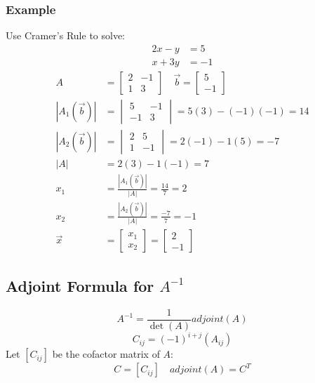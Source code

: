 \documentclass[letterpaper, 12pt]{math}
\begin{document}
\subsubsection*{Example}
Use Cramer's Rule to solve:
\begin{align*}
  2x-y &= 5 \\
  x+3y &= -1
\end{align*}
\begin{align*}
  A &= \begin{bmatrix}
    2 & -1 \\
    1 & 3
  \end{bmatrix} \quad \vec{b} = \begin{bmatrix}5 \\ -1\end{bmatrix} \\
  |A_1(\vec{b})| &= \begin{vmatrix}
    5 & -1 \\
    -1 & 3
  \end{vmatrix} = 5(3)-(-1)(-1) = 14 \\
  |A_2(\vec{b})| &= \begin{vmatrix}
    2 & 5 \\
    1 & -1
  \end{vmatrix} = 2(-1)-1(5) = -7 \\
  |A| &= 2(3)-1(-1) = 7 \\
  x_1 &= \frac{|A_1(\vec{b})|}{|A|} = \frac{14}{7} = 2 \\
  x_2 &= \frac{|A_2(\vec{b})|}{|A|} = \frac{-7}{7} = -1 \\
  \vec{x} &= \begin{bmatrix}x_1 \\ x_2\end{bmatrix} = \begin{bmatrix}
    2 \\ -1
  \end{bmatrix}
\end{align*}

\subsection*{Adjoint Formula for \( A^{-1} \)}
\[ A^{-1} = \frac{1}{\det(A)}adjoint(A) \]
\[ C_{ij} = (-1)^{i+j}(A_{ij}) \]
Let \( [C_{ij}] \) be the cofactor matrix of \( A \):
\[ C = [C_{ij}] \quad adjoint(A) = C^T \]
\end{document}
